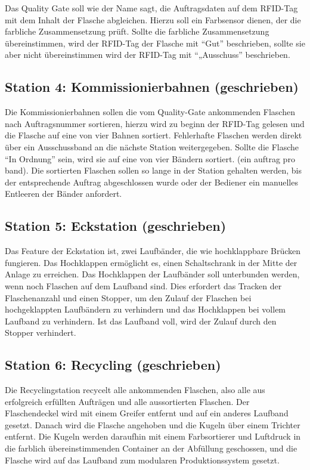 Das Quality Gate soll wie der Name sagt, die Auftragsdaten auf dem RFID-Tag mit dem Inhalt der Flasche abgleichen. Hierzu 
soll ein Farbsensor dienen, der die farbliche Zusammensetzung prüft. Sollte die farbliche Zusammensetzung übereinstimmen, 
wird der RFID-Tag der Flasche mit “Gut” beschrieben, sollte sie aber nicht übereinstimmen wird der RFID-Tag mit “„Ausschuss” 
beschrieben.

\subsection{Station 4: Kommissionierbahnen (geschrieben)}\label{sec:Station 4: Kommissionierbahnen}

Die Kommissionierbahnen sollen die vom Quality-Gate ankommenden Flaschen nach Auftragsnummer sortieren, hierzu wird zu 
beginn der RFID-Tag gelesen und die Flasche auf eine von vier Bahnen sortiert. Fehlerhafte Flaschen werden direkt über ein 
Ausschussband an die nächste Station weitergegeben. Sollte die Flasche “In Ordnung” sein, wird sie auf eine von vier Bändern 
sortiert. (ein auftrag pro band). Die sortierten Flaschen sollen so lange in der Station gehalten werden,
bis der entsprechende Auftrag abgeschlossen wurde oder der Bediener ein
manuelles Entleeren der Bänder anfordert.

\subsection{Station 5: Eckstation (geschrieben)}\label{sec:Station 5: Eckstation}

Das Feature der Eckstation ist, zwei Laufbänder, die wie hochklappbare Brücken fungieren. Das Hochklappen ermöglicht es, 
einen Schaltschrank in der Mitte der Anlage zu erreichen. Das Hochklappen der Laufbänder soll unterbunden werden, wenn 
noch Flaschen auf dem Laufband sind. Dies erfordert das Tracken der Flaschenanzahl und einen Stopper, um den Zulauf der 
Flaschen bei hochgeklappten Laufbändern zu verhindern und das Hochklappen bei vollem Laufband zu verhindern. Ist das 
Laufband voll, wird der Zulauf durch den Stopper verhindert.

\subsection{Station 6: Recycling (geschrieben)}\label{sec:Station 6: Recycling}

Die Recyclingstation recycelt alle ankommenden Flaschen, also alle aus erfolgreich erfüllten Aufträgen und alle aussortierten
Flaschen. Der Flaschendeckel wird mit einem Greifer entfernt und auf ein anderes Laufband gesetzt. Danach wird die Flasche 
angehoben und die Kugeln über einem Trichter entfernt. Die Kugeln werden daraufhin mit einem Farbsortierer und Luftdruck in 
die farblich übereinstimmenden Container an der Abfüllung geschossen, und die Flasche wird auf das Laufband zum modularen 
Produktionssystem gesetzt.

